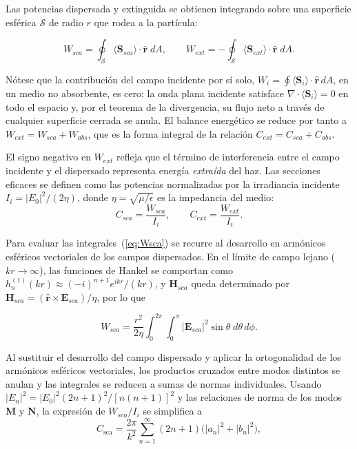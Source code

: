 Las potencias dispersada y extinguida se obtienen integrando sobre una
superficie esférica $\mathcal{S}$ de radio $r$ que rodea a la partícula:

\begin{equation}
\label{eq:Wsca}
  W_{sca} = \oint_{\mathcal{S}} \langle\mathbf{S}_{sca}\rangle\cdot\hat{\mathbf{r}}\;dA,
  \qquad
  W_{ext} = -\oint_{\mathcal{S}} \langle\mathbf{S}_{ext}\rangle\cdot\hat{\mathbf{r}}\;dA.
\end{equation}

Nótese que la contribución del campo incidente por sí solo,
$W_i = \oint \langle\mathbf{S}_i\rangle\cdot\hat{\mathbf{r}}\,dA$, en un
medio no absorbente, es cero: la onda plana incidente satisface
$\nabla\cdot\langle\mathbf{S}_i\rangle = 0$ en todo el espacio y,
por el teorema de la divergencia, su flujo neto a través de
cualquier superficie cerrada se anula. 
El balance energético se reduce por tanto a $W_{ext} = W_{sca} + W_{abs}$,
que es la forma integral de la relación $C_{ext} = C_{sca} + C_{abs}$.

El signo negativo en $W_{ext}$ refleja que el término de interferencia entre
el campo incidente y el dispersado representa energía \emph{extraída} del haz.
Las secciones eficaces se definen como las potencias normalizadas por la
irradiancia incidente $I_i = |E_0|^2/(2\eta)$, donde $\eta = \sqrt{\mu/\epsilon}$
es la impedancia del medio:
\begin{equation}
  C_{sca} = \frac{W_{sca}}{I_i},
  \qquad
  C_{ext} = \frac{W_{ext}}{I_i}.
\end{equation}

Para evaluar las integrales~(\ref{eq:Wsca}) se recurre al desarrollo en
armónicos esféricos vectoriales de los campos dispersados. En el límite de
campo lejano ($kr\to\infty$), las funciones de Hankel se comportan como
$h_n^{(1)}(kr)\approx (-i)^{n+1}e^{ikr}/(kr)$, y $\mathbf{H}_{sca}$
queda determinado por $\mathbf{H}_{sca} = (\hat{\mathbf{r}}\times\mathbf{E}_{sca})/\eta$,
por lo que

\begin{equation}
  W_{sca} = \frac{r^2}{2\eta}\int_0^{2\pi}\!\int_0^{\pi}
  |\mathbf{E}_{sca}|^2\sin\theta\;d\theta\,d\phi.
\end{equation}

Al sustituir el desarrollo del campo dispersado y aplicar la
ortogonalidad de los armónicos esféricos vectoriales, los productos cruzados
entre modos distintos se anulan y las integrales se reducen a sumas de
normas individuales. Usando $|E_n|^2 = |E_0|^2(2n+1)^2/[n(n+1)]^2$ y
las relaciones de norma de los modos $\mathbf{M}$ y $\mathbf{N}$, la
expresión de $W_{sca}/I_i$ se simplifica a
\begin{equation}
  C_{\text{sca}} = \frac{2\pi}{k^2}
  \sum_{n=1}^{\infty} (2n+1)
  \bigl( |a_n|^2 + |b_n|^2 \bigr),
\end{equation}

